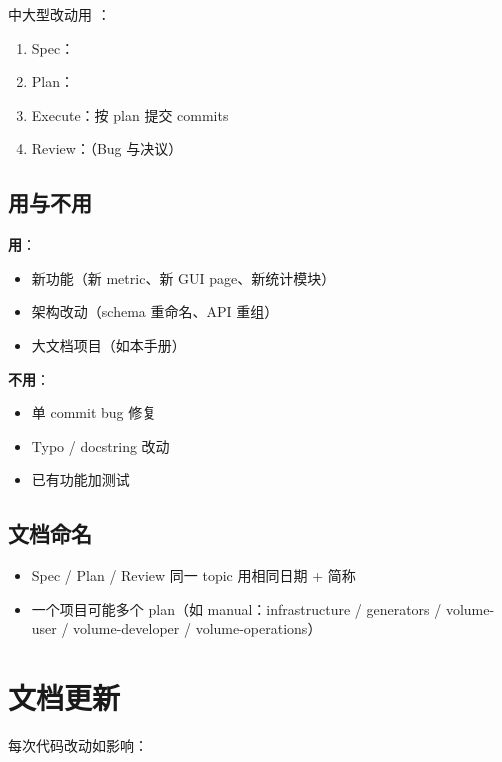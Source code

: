 中大型改动用 ：

\begin{enumerate}
  \item Spec：
  \item Plan：
  \item Execute：按 plan 提交 commits
  \item Review：（Bug 与决议）
\end{enumerate}

\subsection{用与不用}

\textbf{用}：

\begin{itemize}
  \item 新功能（新 metric、新 GUI page、新统计模块）
  \item 架构改动（schema 重命名、API 重组）
  \item 大文档项目（如本手册）
\end{itemize}

\textbf{不用}：

\begin{itemize}
  \item 单 commit bug 修复
  \item Typo / docstring 改动
  \item 已有功能加测试
\end{itemize}

\subsection{文档命名}

\begin{itemize}
  \item Spec / Plan / Review 同一 topic 用相同日期 + 简称
  \item 一个项目可能多个 plan（如 manual：infrastructure / generators / volume-user / volume-developer / volume-operations）
\end{itemize}

\section{文档更新}

每次代码改动如影响：

